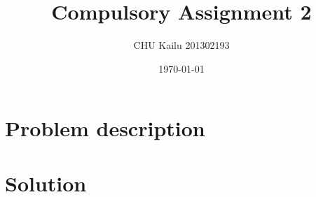 \documentclass[10pt]{article}
\title{Compulsory Assignment 2}
\author{CHU Kailu 201302193}
\date{\today}
\begin{document}
\maketitle

\section{Problem description}

\section{Solution}
\end{document}
